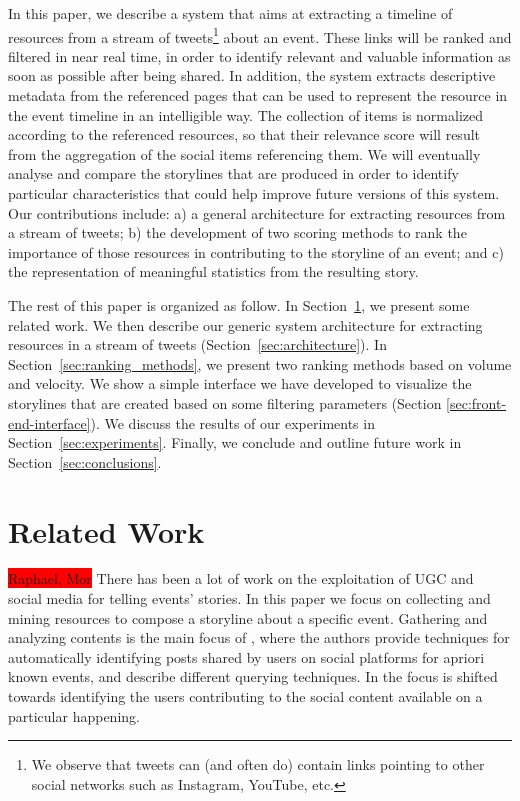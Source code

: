 \documentclass{sig-alternate}
\newcommand{\todo}[1]{\colorbox{red}{#1}}
\begin{document}
In this paper, we describe a system that aims at extracting a timeline of resources from a stream of tweets\footnote{We observe that tweets can (and often do) contain links pointing to other social networks such as Instagram, YouTube, etc.} about an event. These links will be ranked and filtered in near real time, in order to identify relevant and valuable information as soon as possible after being shared. In addition, the system extracts descriptive metadata from the referenced pages that can be used to represent the resource in the event timeline in an intelligible way. The collection of items is normalized according to the referenced resources, so that their relevance score will result from the aggregation of the social items referencing them. We will eventually analyse and compare the storylines that are produced in order to identify particular characteristics that could help improve future versions of this system. Our contributions include: a) a general architecture for extracting resources from a stream of tweets; b) the development of two scoring methods to rank the importance of those resources in contributing to the storyline of an event; and c) the representation of meaningful statistics from the resulting story.

The rest of this paper is organized as follow. In Section~\ref{sec:related-work}, we present some related work. We then describe our generic system architecture for extracting resources in a stream of tweets (Section~\ref{sec:architecture}). In Section~\ref{sec:ranking_methods}, we present two ranking methods based on volume and velocity. We show a simple interface we have developed to visualize the storylines that are created based on some filtering parameters (Section \ref{sec:front-end-interface}). We discuss the results of our experiments in Section~\ref{sec:experiments}. Finally, we conclude and outline future work in Section~\ref{sec:conclusions}.


\section{Related Work}
\label{sec:related-work}
\todo{Raphael, Mor}
There has been a lot of work on the exploitation of UGC and social media for telling events' stories. In this paper we focus on collecting and mining resources to compose a storyline about a specific event. Gathering and analyzing contents is the main focus of \cite{becker:WSDM12}, where the authors provide techniques for automatically identifying posts shared by users on social platforms for apriori known events, and describe different querying techniques. In \cite{naaman:CSCW12} the focus is shifted towards identifying the users contributing to the social content available on a particular happening.
\end{document}

